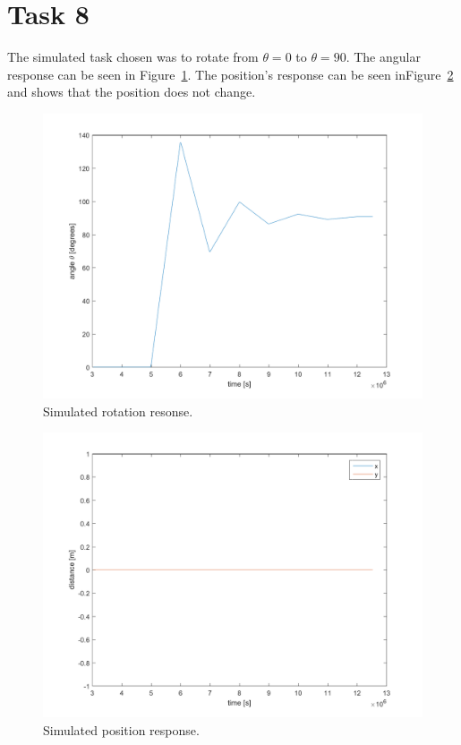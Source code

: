 \documentclass[a4paper,12pt,oneside,onecolumn]{article} %
\begin{document}
\section*{Task 8}
    The simulated task chosen was to rotate from $\theta = 0$ to $\theta = 90$.
    The angular response can be seen in Figure~\ref{fig:task8_angleplot}. The
    position's response can be seen inFigure~\ref{fig:task8_posplot} and shows
    that the position does not change.  \begin{figure}[H]
        \centering
        \includegraphics[scale = 0.5]{../matlab/images/task8_angleplot.png}
        \caption{Simulated rotation resonse.}
        \label{fig:task8_angleplot}
    \end{figure}
    \begin{figure}[H]
        \centering
        \includegraphics[scale = 0.5]{../matlab/images/task8_posplot.png}
        \caption{Simulated position response.}
        \label{fig:task8_posplot}
    \end{figure}
\end{document}
